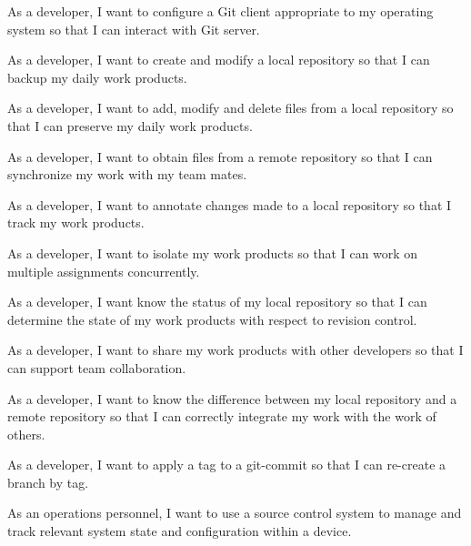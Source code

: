 \begin{description}[leftmargin=5em,style=nextline]

\item[IUR-000] As a developer, I want to configure a Git client appropriate to
  my operating system so that I can interact with Git server. 

\item[IUR-001] As
  a developer, I want to create and modify a local repository so that I can
  backup my daily work products.

\item[IUR-002] As a developer, I want to add, modify and delete files from
  a local repository so that I can preserve my daily work products.

\item[IUR-003] As a developer, I want to obtain files from a remote repository
  so that I can synchronize my work with my team mates.
\item[IUR-004] As a developer, I want to annotate changes made to a local
  repository so that I track my work products.

\item[IUR-005] As a developer,
  I want to isolate my work products so that I can work on multiple assignments
  concurrently.

\item[IUR-006] As a developer, I want know the status of my local repository so
  that I can determine the state of my work products with respect to revision
  control.

\item[IUR-007] As a developer, I want to share my work products with
  other developers so that I can support team collaboration.

\item[IUR-008] As a developer, I want to know the difference between my local
  repository and a remote repository so that I can correctly integrate my work
  with the work of others.

\item[IUR-009] As a developer, I want to apply a tag to a git-commit so that
  I can re-create a branch by tag.

\item[IUR-010] As an operations personnel, I want to use a source control system
  to manage and track relevant system state and configuration within a device.

\end{description}
